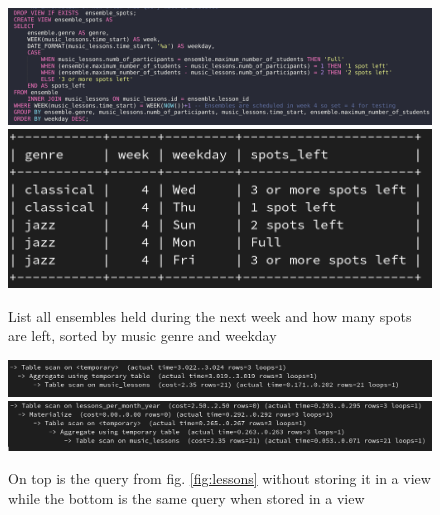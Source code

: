 \documentclass[a4paper]{scrreprt}
\begin{document}
\begin{figure}[h]
    \begin{center}
        \includegraphics[width=\textwidth]{../img/ensembleSQL.png} \\
        \includegraphics[width=\textwidth]{../img/ensemble_spots.png}
        \caption{List all ensembles held during the next week and how many spots are left, sorted by music genre and weekday}
        \label{fig:ensemble}
    \end{center}
\end{figure}
\begin{figure}[h]
    \begin{center}
        \includegraphics[width=\textwidth]{../img/explain_analyze_no_view_month_year.png} \\
        \includegraphics[width=\textwidth]{../img/explain_analyze_lessons_per_month_year.png}
        \caption{On top is the query from fig. \ref{fig:lessons} without storing it in a view while the bottom is the same query when stored in a view}
        \label{fig:explainLesson}
    \end{center}
\end{figure}
\end{document}
